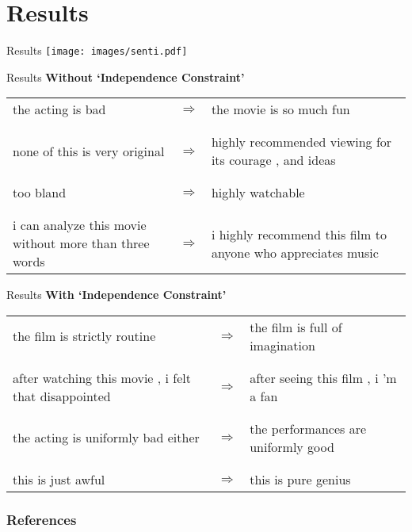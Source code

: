 \documentclass{beamer}
\begin{document}
\section{Results}
\begin{frame}{Results}
  \centering
  \texttt{[image: images/senti.pdf]}
\end{frame}

\begin{frame}{Results}
  \centering
  \textbf{Without `Independence Constraint'}

  \vspace{0.5cm}
  
  \small
  \begin{tabular}{ p{.4\linewidth} p{.05\linewidth} p{.4\linewidth} }
    the acting is bad & $\Rightarrow$ & the movie is so much fun \\ \\ 
    \hline \\
    none of this is very original & $\Rightarrow$ & highly recommended viewing for its courage , and ideas \\ \\
    \hline \\
    too bland & $\Rightarrow$ & highly watchable \\ \\
    \hline \\
    i can analyze this movie without more than three words & $\Rightarrow$ & i highly recommend this film to anyone who appreciates music
  \end{tabular}
\end{frame}

\begin{frame}{Results}
  \centering
  {\large \textbf{With `Independence Constraint'}}
  
  \vspace{0.5cm}

  \small
  \begin{tabular}{ p{.4\linewidth} p{.05\linewidth} p{.4\linewidth} }
    the film is strictly routine & $\Rightarrow$ & the film is full of imagination \\  \\
    \hline \\
    after watching this movie , i felt that disappointed & $\Rightarrow$ & after seeing this film , i 'm a fan \\  \\
    \hline \\
    the acting is uniformly bad either & $\Rightarrow$ & the performances are uniformly good \\  \\
    \hline \\
    this is just awful & $\Rightarrow$ & this is pure genius
  \end{tabular}
\end{frame}


\begin{frame}[shrink=20]
  \frametitle{References}
  
  
\end{frame}
\end{document}
